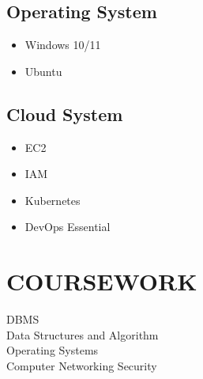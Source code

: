 \documentclass[letterpaper]{deedy-resume} %
\begin{document}
\begin{minipage}[t]{0.33\textwidth}
\subsection{Operating System}
\sectionspace
\begin{itemize}
\item Windows 10/11
\item Ubuntu
\end{itemize}

\subsection{Cloud System}
\sectionspace
\begin{itemize}
\item EC2
\item IAM
\item Kubernetes
\item DevOps Essential
\end{itemize}

\section{COURSEWORK}
\sectionspace

DBMS\\
Data Structures and Algorithm\\
Operating Systems\\
Computer Networking Security


\end{minipage} %
\hfill
%
%
\end{document}
